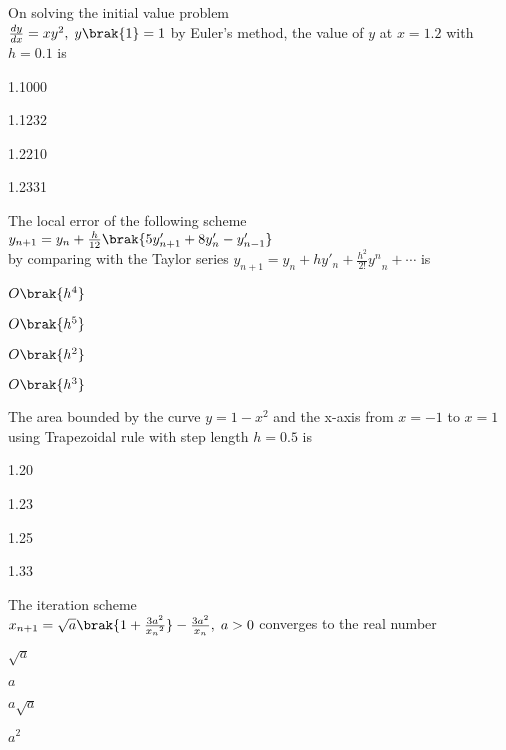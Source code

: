 \bigskip
\item On solving the initial value problem\\
$\frac{dy}{dx}=xy^2,\; y\brak{1}=1$ by Euler's method, the value of $y$ at $x=1.2$ with $h=0.1$ is
\begin{enumerate}
    \begin{multicols}{4}
        \item 1.1000
        \item 1.1232
        \item 1.2210
        \item 1.2331
    \end{multicols}
\end{enumerate}
\bigskip
\item The local error of the following scheme\\
$y_{n+1}=y_n+\frac{h}{12}\brak{5y'_{n+1}+8y'_{n}-y'_{n-1}}$\\
by comparing with the Taylor series $y_{n+1}=y_n+hy'_n+\frac{h^2}{2!}{y^n}_n+\cdots$ is
\begin{enumerate}
    \begin{multicols}{4}
        \item $O\brak{h^4}$
        \item $O\brak{h^5}$
        \item $O\brak{h^2}$
        \item $O\brak{h^3}$
    \end{multicols}
\end{enumerate}
\bigskip
\item The area bounded by the curve $y=1-x^2$ and the x-axis from $x=-1$ to $x=1$ using Trapezoidal rule with step length $h=0.5$ is
\begin{enumerate}
    \begin{multicols}{4}
        \item 1.20
        \item 1.23
        \item 1.25
        \item 1.33
    \end{multicols}
\end{enumerate}
\bigskip
\item The iteration scheme\\
$x_{n+1}=\sqrt{a}\brak{1+\frac{3a^2}{{x_n}^2}}-\frac{3a^2}{x_n},\; a>0$ converges to the real number
\begin{enumerate}
    \begin{multicols}{4}
        \item $\sqrt{a}$
        \item $a$
        \item $a\sqrt{a}$
        \item $a^2$
    \end{multicols}
\end{enumerate}
